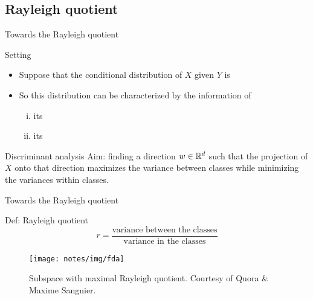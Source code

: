 \documentclass[xcolor={usenames,dvipsnames},handout]{beamer}
\begin{document}
\subsection{Rayleigh quotient}
	\begin{frame}{Towards the Rayleigh quotient}
	
	\begin{block}{Setting}
	\begin{itemize}
	\item Suppose that the conditional distribution of $X$ given $Y$ is 
	\pause
	\item So this  distribution can be characterized by the information of
	\begin{enumerate}[(i)]
	\item  its 
	\item  its 
	\end{enumerate}
	\end{itemize}
	\end{block}
	
	\pause
	
	\begin{block}{Discriminant analysis}
	 Aim: finding a direction $w\in\mathbb{R}^d$ such that the projection of $X$ onto that direction maximizes the variance between classes while minimizing the variances within classes.
	 \end{block}
	 
	\end{frame}

	\begin{frame}{Towards the Rayleigh quotient}
	
	\begin{block}{Def: Rayleigh quotient}
		$$
			r = \frac{\text{variance between the classes}}{\text{variance in the classes}}
		$$
	\end{block}
	\begin{figure}[ht]
		\center
		\texttt{[image: notes/img/fda]}
		\caption{Subspace with maximal Rayleigh quotient.
		Courtesy of Quora \& Maxime Sangnier.}
		\label{fig:fda}
	\end{figure}
	\end{frame}
\end{document}

